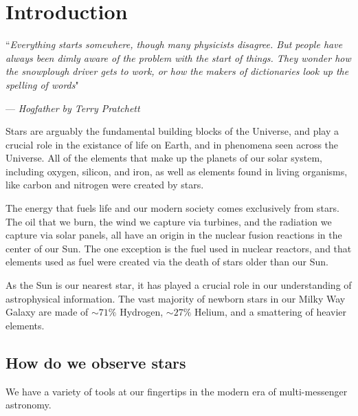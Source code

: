 \documentclass[../dissertation.tex]{subfiles}
\begin{document}
\chapter{Introduction}
\label{ch:intro}

\singlespace
\epigraph{``\emph{Everything starts somewhere, though many physicists disagree. But people have always been dimly aware of the problem with the start of things. They wonder how the snowplough driver gets to work, or how the makers of dictionaries look up the spelling of words}"}{--- \textit{Hogfather by Terry Pratchett}}

\dblspace

Stars are arguably the fundamental building blocks of the Universe, 
and play a crucial role in the existance of life on Earth, and in phenomena seen across the Universe.
All of the elements that make up the planets of our solar system, including oxygen, silicon, and iron, as well as elements found in living organisms, like carbon and nitrogen were created by stars. 

The energy that fuels life and our modern society comes exclusively from stars. 
The oil that we burn, the wind we capture via turbines, 
and the radiation we capture via solar panels, all have an origin in the nuclear fusion reactions in the center of our Sun. 
The one exception is the fuel used in nuclear reactors, and that elements used as fuel were created via the death of stars older than our Sun.

As the Sun is our nearest star, it has played a crucial role in our understanding of astrophysical information. 
The vast majority of newborn stars in our Milky Way Galaxy are made of $\sim 71 \%$ Hydrogen, $\sim 27 \%$ Helium, and a smattering of heavier elements. 


\section{How do we observe stars}

We have a variety of tools at our fingertips in the modern era of multi-messenger astronomy. 
\end{document}

